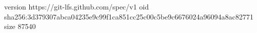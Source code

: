 version https://git-lfs.github.com/spec/v1
oid sha256:3d379307abca04235e9c99f1ca851cc25c00c5be9c6676024a96094a8ac82771
size 87540
